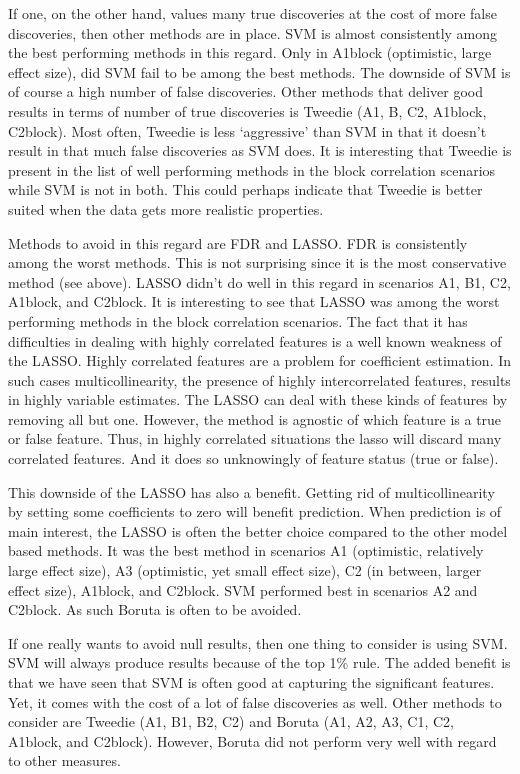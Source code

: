 \documentclass[
]{article}
\begin{document}
If one, on the other hand, values many true discoveries at the cost of more false discoveries, then other methods are in place. SVM is almost consistently among the best performing methods in this regard. Only in A1block (optimistic, large effect size), did SVM fail to be among the best methods. The downside of SVM is of course a high number of false discoveries. Other methods that deliver good results in terms of number of true discoveries is Tweedie (A1, B, C2, A1block, C2block). Most often, Tweedie is less `aggressive' than SVM in that it doesn't result in that much false discoveries as SVM does. It is interesting that Tweedie is present in the list of well performing methods in the block correlation scenarios while SVM is not in both. This could perhaps indicate that Tweedie is better suited when the data gets more realistic properties.

Methods to avoid in this regard are FDR and LASSO. FDR is consistently among the worst methods. This is not surprising since it is the most conservative method (see above). LASSO didn't do well in this regard in scenarios A1, B1, C2, A1block, and C2block. It is interesting to see that LASSO was among the worst performing methods in the block correlation scenarios. The fact that it has difficulties in dealing with highly correlated features is a well known weakness of the LASSO. Highly correlated features are a problem for coefficient estimation. In such cases multicollinearity, the presence of highly intercorrelated features, results in highly variable estimates. The LASSO can deal with these kinds of features by removing all but one. However, the method is agnostic of which feature is a true or false feature. Thus, in highly correlated situations the lasso will discard many correlated features. And it does so unknowingly of feature status (true or false).

This downside of the LASSO has also a benefit. Getting rid of multicollinearity by setting some coefficients to zero will benefit prediction. When prediction is of main interest, the LASSO is often the better choice compared to the other model based methods. It was the best method in scenarios A1 (optimistic, relatively large effect size), A3 (optimistic, yet small effect size), C2 (in between, larger effect size), A1block, and C2block. SVM performed best in scenarios A2 and C2block. As such Boruta is often to be avoided.

If one really wants to avoid null results, then one thing to consider is using SVM. SVM will always produce results because of the top 1\% rule. The added benefit is that we have seen that SVM is often good at capturing the significant features. Yet, it comes with the cost of a lot of false discoveries as well. Other methods to consider are Tweedie (A1, B1, B2, C2) and Boruta (A1, A2, A3, C1, C2, A1block, and C2block). However, Boruta did not perform very well with regard to other measures.
\end{document}
